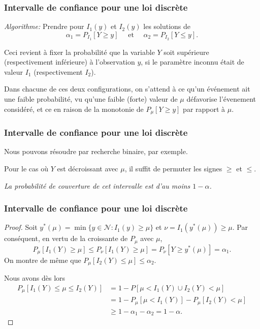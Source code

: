 \documentclass[t,usepdftitle=false]{beamer}
\def\NN{\mathcal{N}}
\begin{document}
\begin{frame}
\frametitle{Intervalle de confiance pour une loi discrète}

\emph{Algorithme:} Prendre pour $I_1(y)$ et $I_2(y)$ les solutions de
\begin{equation}
 \alpha_1 = P_{I_1}[Y \ge y] \quad \mbox{ et } \quad
 \alpha_2 = P_{I_2}[Y \le y].
 \label{eq:ic_discrete}
\end{equation}

\mbox{}

Ceci revient à fixer la probabilité que la variable $Y$ soit
supérieure (respectivement inférieure) à l'observation $y$, si le
paramètre inconnu était de valeur $I_1$ (respectivement $I_2$).

\mbox{}

Dans chacune de ces deux configurations, on s'attend à ce qu'un
événement ait une faible probabilité, vu qu'une faible (forte) valeur
de $\mu$ défavorise l'évenement considéré, et ce en raison de la
monotonie de $P_{\mu}[Y \ge y]$ par rapport à $\mu$.

\end{frame}

\begin{frame}
\frametitle{Intervalle de confiance pour une loi discrète}

Nous pouvons résoudre par recherche binaire, par exemple.

\mbox{}

Pour le cas où $Y$ est décroissant avec $\mu$, il suffit de permuter
les signes $\geq$ et $\leq$.

{\sl
La probabilité de couverture de cet intervalle est d'au moins $1-\alpha$.
}

\end{frame}

\begin{frame}
\frametitle{Intervalle de confiance pour une loi discrète}

\begin{proof}
Soit ${y^*(\mu)} = \min\{y\in\NN : I_1(y)\ge \mu\}$ et 
${\nu} = I_1(y^*(\mu)) \ge \mu$.
Par conséquent, en vertu de la
croissante de $P_{\mu}$ avec $\mu$,
\[
 P_\mu[I_1(Y) \ge \mu]  \le P_\nu[I_1(Y) \ge \mu ]
 = P_\nu [Y \ge y^*(\mu)] = \alpha_1.
\]
On montre de même que $P_\mu[I_2(Y)\le\mu] \le \alpha_2$.

Nous avons dès lors
\begin{align*}
P_\mu [ I_1(Y) \leq \mu \leq I_2(Y) ]  & = 1 - P[ \mu < I_1(Y) \cup I_2(Y) < \mu ] \\
& = 1 - P_\mu[ \mu < I_1(Y) ] - P_\mu[I_2(Y) < \mu] \\
& \geq 1 - \alpha_1 - \alpha_2 = 1-\alpha.
\end{align*}
\end{proof}

\end{frame}
\end{document}
